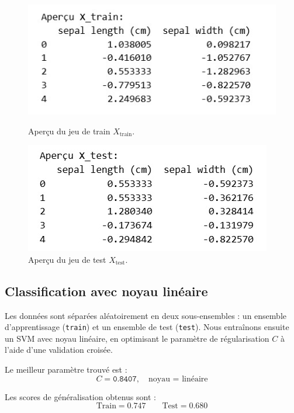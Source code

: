 \documentclass[12pt]{article}
\begin{document}
\begin{figure}[h!]
  \centering
  \begin{minipage}{0.48\textwidth}
    \centering
    \includegraphics[width=\textwidth]{images/vis_train.jpg}
    \caption{Aperçu du jeu de train $X_{\text{train}}$.}
  \end{minipage}\hfill
  \begin{minipage}{0.48\textwidth}
    \centering
    \includegraphics[width=\textwidth]{images/vis_xtest.jpg}
    \caption{Aperçu du jeu de test $X_{\text{test}}$.}
  \end{minipage}
\end{figure}


\subsection{Classification avec noyau linéaire}

Les données sont séparées aléatoirement en deux sous-ensembles : un ensemble d'apprentissage 
(\texttt{train}) et un ensemble de test (\texttt{test}). Nous entraînons ensuite un SVM avec noyau linéaire, 
en optimisant le paramètre de régularisation $C$ à l’aide d’une validation croisée.

Le meilleur paramètre trouvé est : 
\[
C = \texttt{0.8407}, \quad \text{noyau = linéaire}
\]

Les scores de généralisation obtenus sont :
\[
\text{Train} = 0.747 \quad\quad \text{Test} = 0.680
\]
\end{document}
